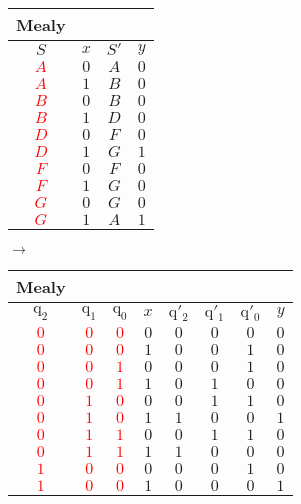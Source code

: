 \documentclass{scrartcl}
\newcommand{\ind}[1]{\ensuremath{\mathrm{#1}}}
\begin{document}
	\begin{tabular}{c c c c}
	Mealy\\
	\hline
	$S$ & $x$ & $S'$ & $y$ \\	
	\hline
	\textcolor{red}{$A$} & $0$ & $A$ & $0$\\
	\textcolor{red}{$A$} & $1$ & $B$ & $0$\\
	\textcolor{red}{$B$} & $0$ & $B$ & $0$\\
	\textcolor{red}{$B$} & $1$ & $D$ & $0$\\
	\textcolor{red}{$D$} & $0$ & $F$ & $0$\\
	\textcolor{red}{$D$} & $1$ & $G$ & $1$\\
	\textcolor{red}{$F$} & $0$ & $F$ & $0$\\
	\textcolor{red}{$F$} & $1$ & $G$ & $0$\\
	\textcolor{red}{$G$} & $0$ & $G$ & $0$\\
	\textcolor{red}{$G$} & $1$ & $A$ & $1$\\
	\hline
	\end{tabular}
	\phantom{---------------------}$\longrightarrow$\phantom{-------------------}
	\begin{tabular}{*{8}{c}}
	Mealy\\
	\hline
	$\ind{q_2}$ & $\ind{q_1}$ & $\ind{q_0}$ & $x$ & $\ind{q'_2}$ & $\ind{q'_1}$ &$\ind{q'_0}$ & $y$ \\	
	\hline
	\textcolor{red}{$0$} & \textcolor{red}{$0$} & \textcolor{red}{$0$} & $0$ & $0$ & $0$ & $0$ & $0$\\
	\textcolor{red}{$0$} & \textcolor{red}{$0$} & \textcolor{red}{$0$} & $1$ & $0$ & $0$ & $1$ & $0$\\
	\textcolor{red}{$0$} & \textcolor{red}{$0$} & \textcolor{red}{$1$} & $0$ & $0$ & $0$ & $1$ & $0$\\
	\textcolor{red}{$0$} & \textcolor{red}{$0$} & \textcolor{red}{$1$} & $1$ & $0$ & $1$ & $0$ & $0$\\
	\textcolor{red}{$0$} & \textcolor{red}{$1$} & \textcolor{red}{$0$} & $0$ & $0$ & $1$ & $1$ & $0$\\
	\textcolor{red}{$0$} & \textcolor{red}{$1$} & \textcolor{red}{$0$} & $1$ & $1$ & $0$ & $0$ & $1$\\
	\textcolor{red}{$0$} & \textcolor{red}{$1$} & \textcolor{red}{$1$} & $0$ & $0$ & $1$ & $1$ & $0$\\
	\textcolor{red}{$0$} & \textcolor{red}{$1$} & \textcolor{red}{$1$} & $1$ & $1$ & $0$ & $0$ & $0$\\
	\textcolor{red}{$1$} & \textcolor{red}{$0$} & \textcolor{red}{$0$} & $0$ & $0$ & $0$ & $1$ & $0$\\
	\textcolor{red}{$1$} & \textcolor{red}{$0$} & \textcolor{red}{$0$} & $1$ & $0$ & $0$ & $0$ & $1$\\
	\hline
	\end{tabular}
\end{document}
